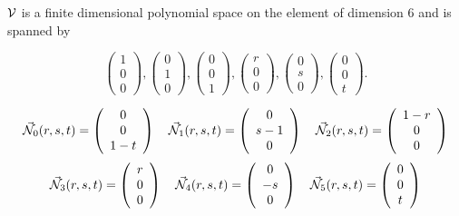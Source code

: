 ${\cal V}$ is a finite dimensional polynomial space on the element of dimension $6$ and is spanned by 

\[
\left( \begin{array}{c} 1 \\ 0 \\ 0  \end{array} \right),
\left( \begin{array}{c} 0 \\ 1 \\ 0  \end{array} \right),
\left( \begin{array}{c} 0 \\ 0 \\ 1 \end{array} \right),
\left( \begin{array}{c} r \\ 0 \\ 0 \end{array} \right),
\left( \begin{array}{c} 0 \\ s \\ 0 \end{array} \right),
\left( \begin{array}{c} 0 \\ 0 \\ t \end{array} \right).
\]

\[
\vec{{\mathcal{N}}}_0(r,s,t) = \left( \begin{array}{c} 0\\0\\1-t  \end{array} \right) 
\quad
\vec{{\mathcal{N}}}_1(r,s,t) = \left( \begin{array}{c} 0\\s-1\\0  \end{array} \right) 
\quad
\vec{{\mathcal{N}}}_2(r,s,t) = \left( \begin{array}{c} 1-r\\0 \\0  \end{array} \right) 
\]
\[
\vec{{\mathcal{N}}}_3(r,s,t) = \left( \begin{array}{c} r\\0\\0  \end{array} \right) 
\quad
\vec{{\mathcal{N}}}_4(r,s,t) = \left( \begin{array}{c} 0\\-s\\0  \end{array} \right) 
\quad
\vec{{\mathcal{N}}}_5(r,s,t) = \left( \begin{array}{c} 0\\0\\t  \end{array} \right) 
\]



